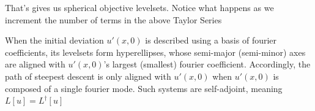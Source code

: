 \documentclass[longbibliography,amsmath,amssymb,aps,nofootinbib]{revtex4-2}
\newcommand\Ra{\mathrm{Ra}}
\begin{document}
That's gives us spherical objective levelsets. Notice what happens as we increment the number of terms in the above Taylor Series



\clearpage
When the initial deviation $u'(x, 0)$ is described using a basis of fourier coefficients, its levelsets form hyperellipses, whose semi-major (semi-minor) axes are aligned with $u'(x, 0)$'s largest (smallest) fourier coefficient.
Accordingly, the path of steepest descent is only aligned with $u'(x, 0)$ when $u'(x, 0)$ is composed of a single fourier mode. Such systems are self-adjoint, meaning $L[u] = L^{\dagger}[u]$

\end{document}
